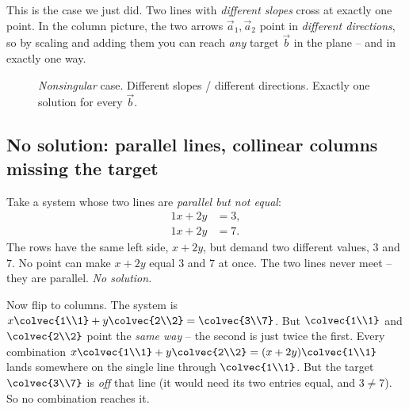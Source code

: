 This is the case we just did. Two lines with \emph{different slopes} cross
at exactly one point. In the column picture, the two arrows
$\vec a_1,\vec a_2$ point in \emph{different directions}, so by scaling and
adding them you can reach \emph{any} target $\vec b$ in the plane -- and in
exactly one way.

\begin{figure}[H]
\centering
{}
\caption{\emph{Nonsingular} case. Different slopes / different directions.
Exactly one solution for every $\vec b$.}
\label{ch06:one}
\end{figure}

\subsection{No solution: parallel lines, collinear columns missing the target}

Take a system whose two lines are \emph{parallel but not equal}:
\begin{equation}
  \label{ch06:nosol}
  \begin{aligned}
    1x + 2y &= 3,\\
    1x + 2y &= 7.
  \end{aligned}
\end{equation}
The rows have the same left side, $x+2y$, but demand two different values,
$3$ and $7$. No point can make $x+2y$ equal $3$ and $7$ at once. The two
lines never meet -- they are parallel. \emph{No solution.}

Now flip to columns. The system is
$x\colvec{1\\1}+y\colvec{2\\2}=\colvec{3\\7}$. But $\colvec{1\\1}$ and
$\colvec{2\\2}$ point the \emph{same way} -- the second is just twice the
first. Every combination $x\colvec{1\\1}+y\colvec{2\\2}=(x+2y)\colvec{1\\1}$
lands somewhere on the single line through $\colvec{1\\1}$. But the target
$\colvec{3\\7}$ is \emph{off} that line (it would need its two entries equal,
and $3\neq7$). So no combination reaches it.


